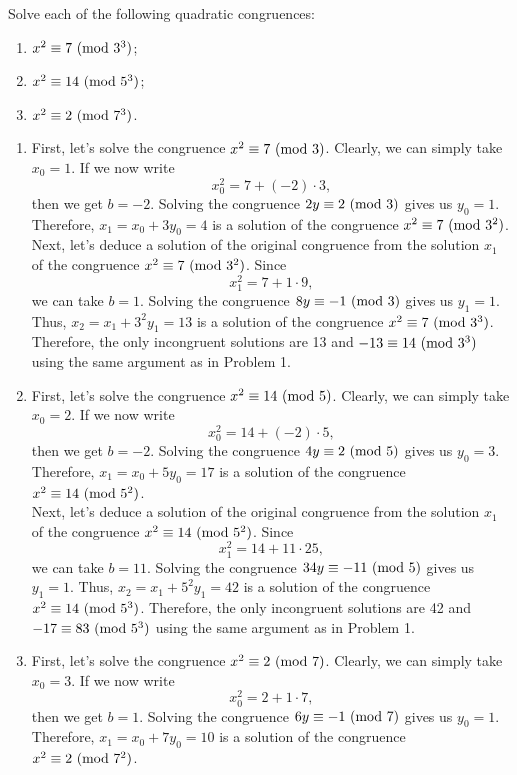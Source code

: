 \begin{exercise}
    Solve each of the following quadratic congruences:
    \begin{enumerate}
        \item $x^2 \equiv 7 \ (\mathrm{mod}\ 3^3)$;
        \item $x^2 \equiv 14 \ (\mathrm{mod}\ 5^3)$;
        \item $x^2 \equiv 2 \ (\mathrm{mod}\ 7^3)$.\\
    \end{enumerate}
\end{exercise}

\begin{solution}
    \begin{enumerate}
        \item First, let's solve the congruence $x^2 \equiv 7 \ (\mathrm{mod}\ 3)$. Clearly, we can simply take $x_0 = 1$. If we now write
        $$x_0^2 = 7 + (-2)\cdot 3,$$
        then we get $b = -2$. Solving the congruence $2y \equiv 2 \ (\mathrm{mod}\ 3)$ gives us $y_0 = 1$. Therefore, $x_1 = x_0 + 3y_0 = 4$ is a solution of the congruence $x^2 \equiv 7 \ (\mathrm{mod}\ 3^2)$. \\

        Next, let's deduce a solution of the original congruence from the solution $x_1$ of the congruence $x^2 \equiv 7 \ (\mathrm{mod}\ 3^2)$. Since
        $$x_1^2 = 7 + 1\cdot 9,$$
        we can take $b = 1$. Solving the congruence $8y \equiv -1 \ (\mathrm{mod}\ 3)$ gives us $y_1 = 1$. Thus, $x_2 = x_1 + 3^2y_1 = 13$ is a solution of the congruence $x^2 \equiv 7 \ (\mathrm{mod}\ 3^3)$. Therefore, the only incongruent solutions are 13 and $-13 \equiv 14 \ (\mathrm{mod}\ 3^3)$ using the same argument as in Problem 1.
        \item First, let's solve the congruence $x^2 \equiv 14 \ (\mathrm{mod}\ 5)$. Clearly, we can simply take $x_0 = 2$. If we now write
        $$x_0^2 = 14 + (-2)\cdot 5,$$
        then we get $b = -2$. Solving the congruence $4y \equiv 2 \ (\mathrm{mod}\ 5)$ gives us $y_0 = 3$. Therefore, $x_1 = x_0 + 5y_0 = 17$ is a solution of the congruence $x^2 \equiv 14 \ (\mathrm{mod}\ 5^2)$. \\

        Next, let's deduce a solution of the original congruence from the solution $x_1$ of the congruence $x^2 \equiv 14 \ (\mathrm{mod}\ 5^2)$. Since
        $$x_1^2 = 14 + 11\cdot 25,$$
        we can take $b = 11$. Solving the congruence $34y \equiv -11 \ (\mathrm{mod}\ 5)$ gives us $y_1 = 1$. Thus, $x_2 = x_1 + 5^2y_1 = 42$ is a solution of the congruence $x^2 \equiv 14 \ (\mathrm{mod}\ 5^3)$. Therefore, the only incongruent solutions are 42 and $-17 \equiv 83 \ (\mathrm{mod}\ 5^3)$ using the same argument as in Problem 1.
        \item First, let's solve the congruence $x^2 \equiv 2 \ (\mathrm{mod}\ 7)$. Clearly, we can simply take $x_0 = 3$. If we now write
        $$x_0^2 = 2 + 1\cdot 7,$$
        then we get $b = 1$. Solving the congruence $6y \equiv -1 \ (\mathrm{mod}\ 7)$ gives us $y_0 = 1$. Therefore, $x_1 = x_0 + 7y_0 = 10$ is a solution of the congruence $x^2 \equiv 2 \ (\mathrm{mod}\ 7^2)$. \\


\end{enumerate}
\end{solution}
